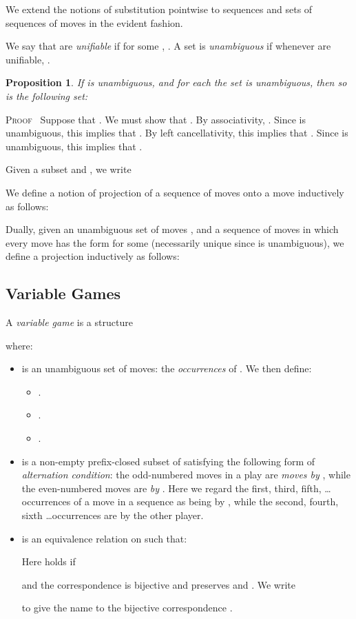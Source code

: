 \documentclass[a4paper,11pt]{article}
\newtheorem{proposition}{Proposition}[section]
\newenvironment{proof}{\textsc{Proof}\ }{}
\begin{document}
\noindent We extend the notions of substitution pointwise to sequences and sets
of sequences of moves in the evident fashion.

\noindent We say that  are \emph{unifiable} if for
some , . A set  is
\emph{unambiguous} if whenever  are unifiable, .

\begin{proposition}
\label{unamb}
If  is unambiguous,
and for each  the set  is unambiguous, then so is the
following set:

\end{proposition}
\begin{proof}
Suppose that . We must show
that . By associativity, . Since  is unambiguous, this implies that
. By left cancellativity, this implies that . Since  is unambiguous, this implies that
.
\end{proof}

\noindent Given a subset  and , we write


\noindent We define a notion of projection of a sequence of moves 
onto a
move  inductively as follows:


\noindent Dually, given an unambiguous set of moves , and a
sequence of moves  in which every move has the form  for some  (necessarily unique since  is unambiguous), we define a
projection  inductively as follows:


\subsection{Variable Games}
A \emph{variable game} is a structure

where:
\begin{itemize}
\item
 is an unambiguous  set of moves: the
\emph{occurrences} of . We then define:
\begin{itemize}
\item .
\item .
\item .
\end{itemize}

\item  is a non-empty prefix-closed subset of 
  satisfying the following form of \emph{alternation condition}: the
  odd-numbered moves in a play are \emph{moves by }, while the
  even-numbered moves are \emph{by }. Here we regard the first, third,
  fifth, \ldots occurrences of a move  in a sequence as being by
  , while the second, fourth, sixth \ldots occurrences
  are by the other player.


\item  is an equivalence relation on  such that:

Here  holds if

and the correspondence  is bijective and
preserves  and . We
write

to give the name  to the bijective correspondence .
\end{itemize}
\end{document}
